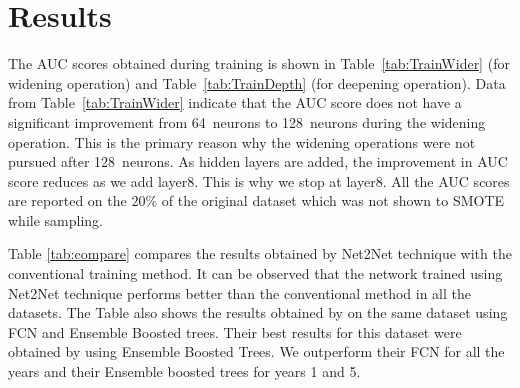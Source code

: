 \section{Results}
\label{sec:results}

The AUC scores obtained during training is shown in Table~\ref{tab:TrainWider} (for widening operation) and Table~\ref{tab:TrainDepth} (for deepening operation). Data from Table~\ref{tab:TrainWider} indicate that the AUC score does not have a significant improvement from 64~neurons to 128~neurons during the widening operation. This is the primary reason why the widening operations were not pursued after 128~neurons. As hidden layers are added, the improvement in AUC score reduces as we add layer8. This is why we stop at layer8. All the AUC scores are reported on the $20\%$ of the original dataset which was not shown to SMOTE while sampling.

Table \ref{tab:compare} compares the results obtained by Net2Net technique with the conventional training method. It can be observed that the network trained using Net2Net technique performs better than the conventional method in all the datasets. The Table also shows the results obtained by \cite{zikeba2016ensemble} on the same dataset using FCN and Ensemble Boosted trees. Their best results for this dataset were obtained by using Ensemble Boosted Trees. We outperform their FCN for all the years and their Ensemble boosted trees for years 1 and 5.


